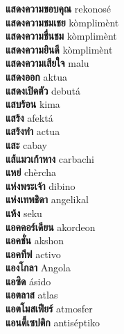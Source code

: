 \textbf{ แสดงความขอบคุณ  } rekonosé \\
\textbf{ แสดงความชมเชย  } kòmplimènt \\
\textbf{ แสดงความชื่นชม  } kòmplimènt \\
\textbf{ แสดงความยินดี  } kòmplimènt \\
\textbf{ แสดงความเสียใจ  } malu \\
\textbf{ แสดงออก  } aktua \\
\textbf{ แสดงเปิดตัว  } debutá \\
\textbf{ แสบร้อน  } kima \\
\textbf{ แสร้ง  } afektá \\
\textbf{ แสร้งทำ  } actua \\
\textbf{ แสะ  } cabay \\
\textbf{ แส้แมวเก้าหาง  } carbachi \\
\textbf{ แหย่  } chèrcha \\
\textbf{ แห่งพระเจ้า  } dibino \\
\textbf{ แห่งเทพธิดา  } angelikal \\
\textbf{ แห้ง  } seku \\
\textbf{ แอคคอร์เดียน  } akordeon \\
\textbf{ แอคชั่น  } akshon \\
\textbf{ แอคทีฟ  } activo \\
\textbf{ แองโกลา  } Angola \\
\textbf{ แอซิด  } ásido \\
\textbf{ แอตลาส  } atlas \\
\textbf{ แอตโมสเฟียร์  } atmosfer \\
\textbf{ แอนตี้เซปติก  } antiséptiko \\

